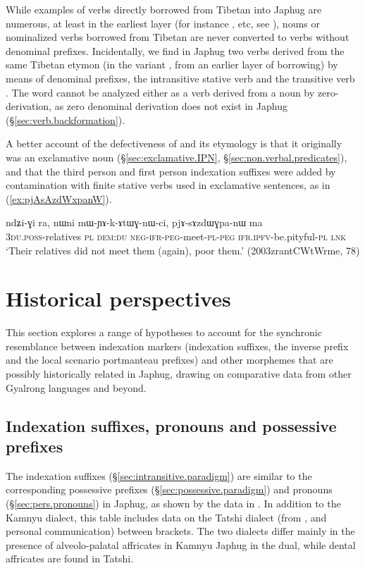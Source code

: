While examples of verbs directly borrowed from Tibetan into Japhug are numerous, at least in the earliest layer (for instance ,  etc, see \citealt{jacques19contact}), nouns or nominalized verbs borrowed from Tibetan are never converted to verbs without denominal prefixes. Incidentally, we find in Japhug two verbs derived from the same Tibetan etymon (in the variant , from an earlier layer of borrowing) by means of denominal prefixes, the intransitive stative verb  and the transitive verb . The word  cannot be analyzed either as a verb derived from a noun by zero-derivation, as zero denominal derivation does not exist in Japhug (§\ref{sec:verb.backformation}).

A better account of the defectiveness of  and its etymology is that it originally was an exclamative noun (§\ref{sec:exclamative.IPN}, §\ref{sec:non.verbal.predicates}), and that the third person and first person indexation suffixes were added by contamination with finite stative verbs used in exclamative sentences, as  in  (\ref{ex:pjAsAzdWxpanW}).

\begin{exe}
\ex \label{ex:pjAsAzdWxpanW}
\gll ndʑi-ɣi ra, nɯni mɯ-ɲɤ-k-ɤtɯɣ-nɯ-ci, pjɤ-sɤzdɯɣpa-nɯ ma \\
\textsc{3du}.\textsc{poss}-relatives \textsc{pl} \textsc{dem}:\textsc{du} \textsc{neg}-\textsc{ifr}-\textsc{peg}-meet-\textsc{pl}-\textsc{peg} \textsc{ifr}.\textsc{ipfv}-be.pityful-\textsc{pl} \textsc{lnk} \\
\glt `Their relatives did not meet them (again), poor them.' (2003zrantCWtWrme, 78)
\end{exe}

 
\section{Historical perspectives}
This section explores a range of hypotheses to account for the synchronic resemblance between indexation markers (indexation suffixes, the inverse prefix and the local scenario portmanteau prefixes) and other morphemes that are possibly historically related in Japhug, drawing on comparative data from other Gyalrong languages and beyond.

\subsection{Indexation suffixes, pronouns and possessive prefixes} \label{sec:indexation.suffixes.history}
The indexation suffixes (§\ref{sec:intransitive.paradigm}) are similar to the corresponding possessive prefixes (§\ref{sec:possessive.paradigm}) and pronouns (§\ref{sec:pers.pronouns}) in Japhug, as shown by the data in . In addition to the Kamnyu dialect, this table includes data on the Tatshi dialect  (from \citealt{linluo03}, \citealt{lin11direction} and personal communication) between brackets. The two dialects differ mainly in the presence of alveolo-palatal affricates in Kamnyu Japhug in the dual, while dental affricates are found in Tatshi.

